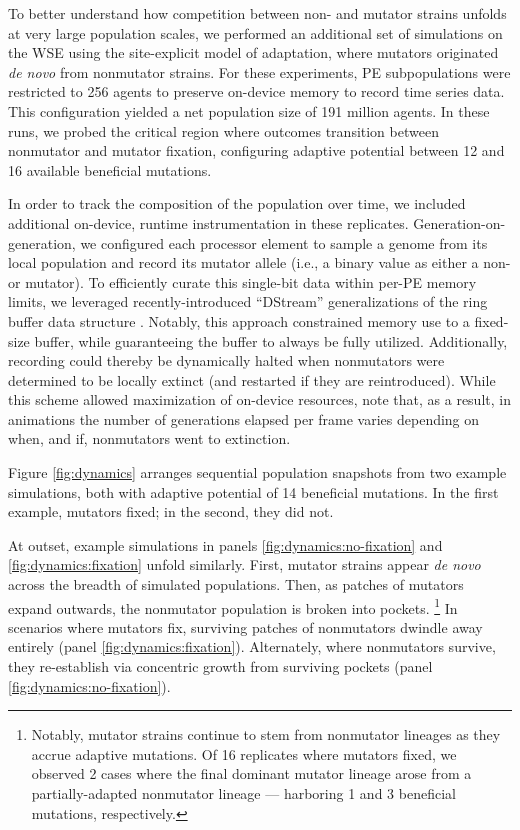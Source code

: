 To better understand how competition between non- and mutator strains unfolds at very large population scales, we performed an additional set of simulations on the WSE using the site-explicit model of adaptation, where mutators originated \textit{de novo} from nonmutator strains.
For these experiments, PE subpopulations were restricted to 256 agents to preserve on-device memory to record time series data.
This configuration yielded a net population size of 191 million agents.
In these runs, we probed the critical region where outcomes transition between nonmutator and mutator fixation, configuring adaptive potential between 12 and 16 available beneficial mutations.

In order to track the composition of the population over time, we included additional on-device, runtime instrumentation in these replicates.
Generation-on-generation, we configured each processor element to sample a genome from its local population and record its mutator allele (i.e., a binary value as either a non- or mutator).
To efficiently curate this single-bit data within per-PE memory limits, we leveraged recently-introduced ``DStream'' generalizations of the ring buffer data structure \citep{moreno2024algorithms}.
Notably, this approach constrained memory use to a fixed-size buffer, while guaranteeing the buffer to always be fully utilized.
Additionally, recording could thereby be dynamically halted when nonmutators were determined to be locally extinct (and restarted if they are reintroduced).
While this scheme allowed maximization of on-device resources, note that, as a result, in animations the number of generations elapsed per frame varies depending on when, and if, nonmutators went to extinction.



Figure \ref{fig:dynamics} arranges sequential population snapshots from two example simulations, both with adaptive potential of 14 beneficial mutations.
In the first example, mutators fixed; in the second, they did not.

At outset, example simulations in panels \ref{fig:dynamics:no-fixation} and \ref{fig:dynamics:fixation} unfold similarly.
First, mutator strains appear \textit{de novo} across the breadth of simulated populations.
Then, as patches of mutators expand outwards, the nonmutator population is broken into pockets.%
\footnote{%
Notably, mutator strains continue to stem from nonmutator lineages as they accrue adaptive mutations.
Of 16 replicates where mutators fixed, we observed 2 cases where the final dominant mutator lineage arose from a partially-adapted nonmutator lineage --- harboring 1 and 3 beneficial mutations, respectively.
}
In scenarios where mutators fix, surviving patches of nonmutators dwindle away entirely (panel \ref{fig:dynamics:fixation}).
Alternately, where nonmutators survive, they re-establish via concentric growth from surviving pockets (panel \ref{fig:dynamics:no-fixation}).


